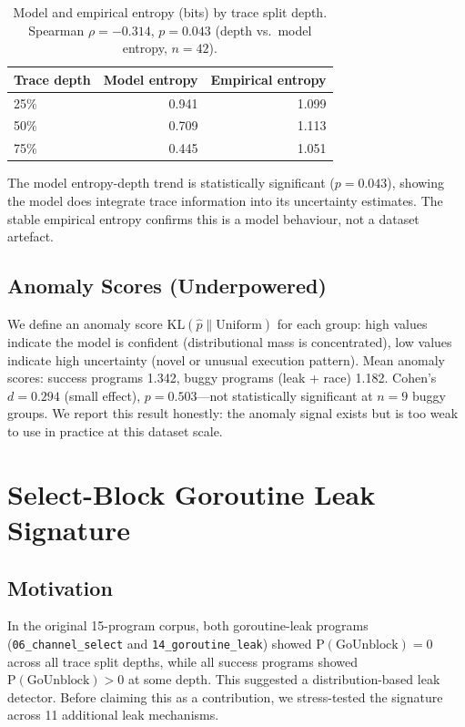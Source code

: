 \documentclass[sigconf,review,anonymous]{acmart}
\begin{document}
\begin{table}[h]
\centering
\caption{Model and empirical entropy (bits) by trace split depth.
Spearman $\rho{=}-0.314$, $p{=}0.043$ (depth vs.\ model entropy, $n{=}42$).}
\label{tab:entropy_depth}
\begin{tabular}{lrr}
\toprule
\textbf{Trace depth} & \textbf{Model entropy} & \textbf{Empirical entropy} \\
\midrule
25\% & 0.941 & 1.099 \\
50\% & 0.709 & 1.113 \\
75\% & 0.445 & 1.051 \\
\bottomrule
\end{tabular}
\end{table}

The model entropy-depth trend is statistically significant ($p{=}0.043$),
showing the model does integrate trace information into its uncertainty
estimates. The stable empirical entropy confirms this is a model behaviour, not a
dataset artefact.

\subsection{Anomaly Scores (Underpowered)}

We define an anomaly score $\mathrm{KL}(\hat{p} \| \mathrm{Uniform})$ for each
group: high values indicate the model is confident (distributional mass is
concentrated), low values indicate high uncertainty (novel or unusual execution
pattern). Mean anomaly scores: success programs 1.342, buggy programs (leak +
race) 1.182. Cohen's $d{=}0.294$ (small effect), $p{=}0.503$---not statistically
significant at $n{=}9$ buggy groups. We report this result honestly: the anomaly
signal exists but is too weak to use in practice at this dataset scale.

\section{Select-Block Goroutine Leak Signature}
\label{sec:leak}

\subsection{Motivation}

In the original 15-program corpus, both goroutine-leak programs
(\texttt{06\_channel\_select} and \texttt{14\_goroutine\_leak}) showed
$\mathrm{P(GoUnblock)=0}$ across all trace split depths, while all success
programs showed $\mathrm{P(GoUnblock)} > 0$ at some depth. This suggested a
distribution-based leak detector. Before claiming this as a contribution, we
stress-tested the signature across 11 additional leak mechanisms.
\end{document}
